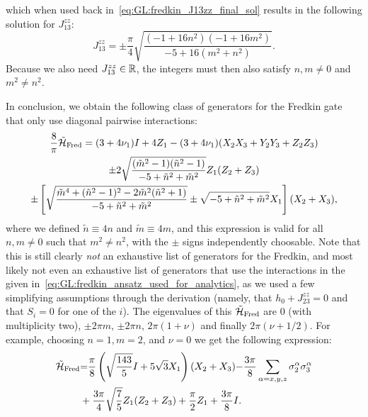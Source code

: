 which when used back in~\cref{eq:GL:fredkin_J13zz_final_sol} results in the following solution for $J_{13}^{zz}$:
\begin{equation}
    J_{13}^{zz} =
    \pm \frac{\pi}{4}
    \sqrt{\frac{
        (-1 + 16 n^2)(-1 + 16 m^2)
    }{
        -5 + 16 (m^2 + n^2)
    }}.
\end{equation}
Because we also need $J_{13}^{zz}\in{\mathbb{R}}$, the integers must then also satisfy  $n,m\neq0$ and $m^2\neq n^2$.

In conclusion, we obtain the following class of generators for the Fredkin gate that only use diagonal pairwise interactions:
\begin{equation}
\begin{gathered}
    \frac{8}{\pi}\tilde{{\mathcal{H}}}_{\operatorname{Fred}} =
    (3 + 4\nu_1) I + 4 Z_1
    - (3 + 4\nu_1) (X_2 X_3 + Y_2 Y_3 + Z_2 Z_3) \\
    \pm 2 \sqrt{\frac{
        (\tilde m^2-1)(\tilde n^2-1)
    }{
        -5 + \tilde n^2 + \tilde m^2
    }} Z_1 ( Z_2 + Z_3) \\
    \pm \left[
    \sqrt{\frac{
        \tilde m^4 + (\tilde n^2-1)^2 - 2 \tilde m^2(\tilde n^2+1)
    }{
        -5 + \tilde n^2 + \tilde m^2
    }}
    \pm \sqrt{-5 + \tilde n^2 + \tilde m^2} X_1
    \right] (X_2 + X_3),
\end{gathered}
\end{equation}
where we defined $\tilde n\equiv 4n$ and $\tilde m\equiv 4m$, and this expression is valid for all $n,m\neq0$ such that $m^2\neq n^2$, with the $\pm$ signs independently choosable.
Note that this is still clearly \emph{not} an exhaustive list of generators for the Fredkin, and most likely not even an exhaustive list of generators that use the interactions in the \ansatz given in~\cref{eq:GL:fredkin_ansatz_used_for_analytics}, as we used a few simplifying assumptions through the derivation (namely, that $h_0+J_{23}^{zz}=0$ and that $S_i=0$ for one of the $i$).
The eigenvalues of this $\tilde{{\mathcal{H}}}_{\operatorname{Fred}}$ are $0$ (with multiplicity two), $\pm 2\pi m$, $\pm2\pi n$, $2\pi(1+\nu)$ and finally $2\pi(\nu+1/2)$.  
For example, choosing $n=1, m=2$, and $\nu=0$ we get the following expression:
\begin{align}
    \tilde{{\mathcal{H}}}_{\operatorname{Fred}} &{=} 
    \frac{\pi}{8} \left( \sqrt{\frac{143}{5}}I+5\sqrt 3 X_1\right)(X_2 + X_3) {-}\frac{3\pi}{8} \sum_{\alpha=x,y,z}\sigma^\alpha_2 \sigma^\alpha_3
    \nonumber\\
    &+
    \frac{3\pi}{4}\sqrt{\frac{7}{5}}Z_1(Z_2+Z_3) +\frac{\pi}{2}Z_1+\frac{3\pi}{8}I.
    \label{eq:GL:fredkin_generator}
\end{align}
